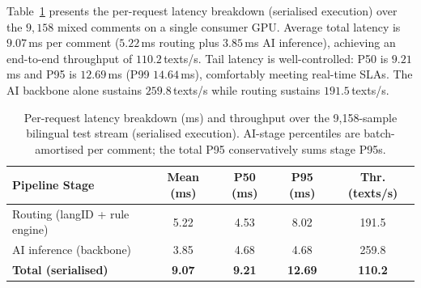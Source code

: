 Table~\ref{tab:latency} presents the per-request latency breakdown (serialised execution) over the $9{,}158$ mixed comments on a single consumer GPU. Average total latency is $9.07$\,ms per comment ($5.22$\,ms routing plus $3.85$\,ms AI inference), achieving an end-to-end throughput of $110.2$\,texts/s. Tail latency is well-controlled: P50 is $9.21$\,ms and P95 is $12.69$\,ms (P99 $14.64$\,ms), comfortably meeting real-time SLAs. The AI backbone alone sustains $259.8$\,texts/s while routing sustains $191.5$\,texts/s.

\begin{table}[t]
\centering
\caption{Per-request latency breakdown (ms) and throughput over the 9{,}158-sample bilingual test stream (serialised execution). AI-stage percentiles are batch-amortised per comment; the total P95 conservatively sums stage P95s.}
\label{tab:latency}
\begin{tabularx}{\textwidth}{Xcccc}
\toprule
Pipeline Stage & Mean (ms) & P50 (ms) & P95 (ms) & Thr. (texts/s) \\
\midrule
Routing (langID + rule engine) & 5.22 & 4.53 & 8.02 & 191.5 \\
AI inference (backbone) & 3.85 & 4.68 & 4.68 & 259.8 \\
\midrule
\textbf{Total (serialised)} & \textbf{9.07} & \textbf{9.21} & \textbf{12.69} & \textbf{110.2} \\
\bottomrule
\end{tabularx}
\end{table}
